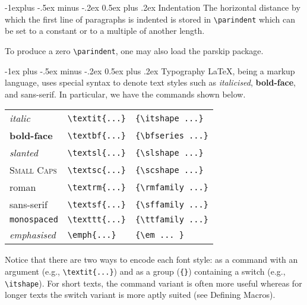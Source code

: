 \documentclass[10pt,landscape,letterpaper]{article}
\makeatletter
\renewcommand{\section}{\@startsection{section}{1}{0mm}%
	{.2ex}%
	{.2ex}%
	{\sffamily\bfseries}}
\renewcommand{\section}{\@startsection{section}{1}{0mm}%
	{-1ex plus -.5ex minus -.2ex}%
	{0.5ex plus .2ex}%
	{\normalfont\large\bfseries}}
\renewcommand{\subsection}{\@startsection{subsection}{2}{0mm}%
	{-1explus -.5ex minus -.2ex}%
	{0.5ex plus .2ex}%
	{\normalfont\normalsize\bfseries}}
\makeatother
\begin{document}
\begin{multicols*}{3}
\subsection{Indentation}
The horizontal distance by which the first line of paragraphs is indented is stored in \verb|\parindent| which can be set to a constant or to a multiple of another length.
\begin{macrocode}
\parindent=0pt
\parindent
\end{macrocode}

To produce a zero \verb|\parindent|, one may also load the {\sffamily parskip} package.

\section{Typography}
\LaTeX, being a markup language, uses special syntax to denote text styles such as {\itshape italicised}, {\bfseries bold-face}, and \textsf{sans-serif}. In particular, we have the commands shown below.
\begin{center}
	\renewcommand{\arraystretch}{1.5}
	\begin{tabular}{|lll|} \hline
		\textit{italic} & \verb|\textit{...}| & \verb|{\itshape ...}|  \\
		 \textbf{bold-face} & \verb|\textbf{...}| & \verb|{\bfseries ...}| \\
		\textsl{slanted} & \verb|\textsl{...}| & \verb|{\slshape ...}| \\
		 \textsc{Small Caps} & \verb|\textsc{...}| & \verb|{\scshape ...}| \\
		\textrm{roman} & \verb|\textrm{...}| & \verb|{\rmfamily ...}| \\
		\textsf{sans-serif} & \verb|\textsf{...}| & \verb|{\sffamily ...}| \\
		\texttt{monospaced} & \verb|\texttt{...}| & \verb|{\ttfamily ...}| \\
		\emph{emphasised} & \verb|\emph{...}| & \verb|{\em ... }| \\
		\hline 
	\end{tabular}
\end{center}
Notice that there are two ways to encode each font style: as a command with an argument (e.g., \verb|\textit{...}|) and as a group (\verb|{}|) containing a switch (e.g., \verb|\itshape|). For short texts, the command variant is often more useful whereas for longer texts the switch variant is more aptly suited (see Defining Macros).


\end{multicols*}
\end{document}
